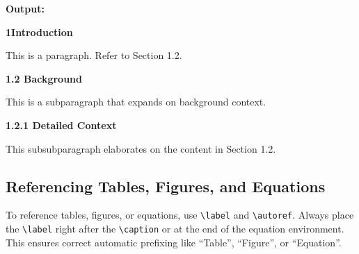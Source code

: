 \documentclass{VISTEC}
\begin{document}
\textbf{Output:}\vspace{0.5em}

\begin{tcolorbox}[colback=white, colframe=black, sharp corners, boxrule=0.4pt]

\textbf{1\hspace{1.1cm}Introduction}\vspace{6pt}

\hspace{1.25cm}This is a paragraph. Refer to Section 1.2.\vspace{6pt}

\hspace{1.25cm}\textbf{1.2 Background}\vspace{6pt}

\hspace{1.95cm}This is a subparagraph that expands on background context.\vspace{6pt}

\hspace{1.95cm}\textbf{1.2.1 Detailed Context}\vspace{6pt}

\hspace{2.95cm}This subsubparagraph elaborates on the content in Section 1.2.

\end{tcolorbox}

\subsection{Referencing Tables, Figures, and Equations}
\label{manual:ref-table-figure}

\begin{subparagraph}
To reference tables, figures, or equations, use \verb|\label| and \verb|\autoref|. Always place the \verb|\label| right after the \verb|\caption| or at the end of the equation environment. This ensures correct automatic prefixing like ``Table'', ``Figure'', or ``Equation''.
\end{subparagraph}
\end{document}
